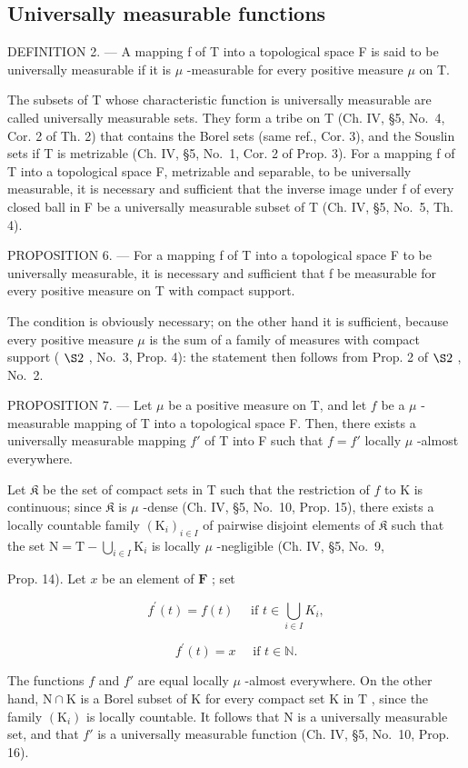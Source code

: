 \subsection{Universally measurable functions}

DEFINITION 2. --- A mapping f of T into a topological space F is said to be universally measurable if it is \(\mu\) -measurable for every positive measure \(\mu\) on T.

The subsets of T whose characteristic function is universally measurable are called universally measurable sets. They form a tribe on T (Ch. IV, §5, No.~4, Cor. 2 of Th. 2) that contains the Borel sets (same ref., Cor. 3), and the Souslin sets if T is metrizable (Ch. IV, §5, No.~1, Cor. 2 of Prop. 3). For a mapping f of T into a topological space F, metrizable and separable, to be universally measurable, it is necessary and sufficient that the inverse image under f of every closed ball in F be a universally measurable subset of T (Ch. IV, §5, No.~5, Th. 4).

PROPOSITION 6. --- For a mapping f of T into a topological space F to be universally measurable, it is necessary and sufficient that f be measurable for every positive measure on T with compact support.

The condition is obviously necessary; on the other hand it is sufficient, because every positive measure \(\mu\) is the sum of a family of measures with compact support ( \(\S2\) , No.~3, Prop. 4): the statement then follows from Prop. 2 of \(\S2\) , No.~2.

PROPOSITION 7. --- Let \(\mu\) be a positive measure on T, and let \(f\) be a \(\mu\) -measurable mapping of T into a topological space F. Then, there exists a universally measurable mapping \(f'\) of T into F such that \(f = f'\) locally \(\mu\) -almost everywhere.

Let \(\mathfrak{K}\) be the set of compact sets in T such that the restriction of \(f\) to K is continuous; since \(\mathfrak{K}\) is \(\mu\) -dense (Ch. IV, §5, No.~10, Prop. 15), there exists a locally countable family \((\mathrm{K}_i)_{i\in I}\) of pairwise disjoint elements of \(\mathfrak{K}\) such that the set \(\mathrm{N} = \mathrm{T} - \bigcup_{i\in I}\mathrm{K}_i\) is locally \(\mu\) -negligible (Ch. IV, §5, No.~9,

Prop. 14). Let \(x\) be an element of \(\mathbf{F}\) ; set

\[
f ^ {\prime} (t) = f (t) \quad \text { if } t \in \bigcup_ {i \in I} K _ {i},
\]

\[
f ^ {\prime} (t) = x \quad \text { if } t \in \mathbb {N}.
\]

The functions \(f\) and \(f'\) are equal locally \(\mu\) -almost everywhere. On the other hand, \(\mathrm{N} \cap \mathrm{K}\) is a Borel subset of \(\mathrm{K}\) for every compact set \(\mathrm{K}\) in \(\mathrm{T}\) , since the family \((\mathrm{K}_i)\) is locally countable. It follows that \(\mathrm{N}\) is a universally measurable set, and that \(f'\) is a universally measurable function (Ch. IV, §5, No.~10, Prop. 16).

